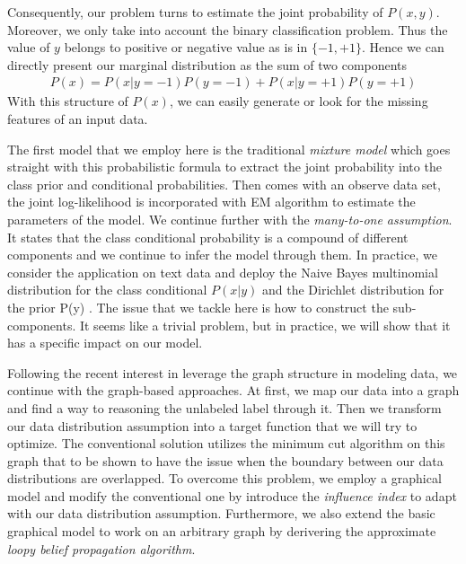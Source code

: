 Consequently, our problem turns to estimate the joint probability of $P(x, y)$. Moreover, we only take into account the binary classification problem. Thus the value of $y$ belongs to positive or negative value as is in $\{-1, +1\}$. Hence we can directly present our marginal distribution as the sum of two components
\begin{align}
	\label{equal1: mixture of labels}
	P(x) = P(x| y=-1)P(y=-1) + P(x| y=+1)P(y=+1)
\end{align} 
With this structure of $P(x)$, we can easily generate or look for the missing features of an input data.

The first model that we employ here is the traditional \textit{mixture model} which goes straight with this probabilistic formula to extract the joint probability into the class prior and conditional probabilities. Then comes with an observe data set, the joint log-likelihood is incorporated with EM algorithm \parencite{10.2307/2984875} to estimate the parameters of the model. We continue further with the \textit{many-to-one assumption}. It states that the class conditional probability is a compound of different components and we continue to infer the model through them. In practice, we consider the application on text data and deploy the Naive Bayes multinomial distribution for the class conditional $P(x|y)$ and the Dirichlet distribution for the prior P(y) \parencite{Nigam:2000:TCL:347709.347724}. The issue that we tackle here is how to construct the sub-components. It seems like a trivial problem, but in practice, we will show that it has a specific impact on our model.

Following the recent interest in leverage the graph structure in modeling data, we continue with the graph-based approaches. At first, we map our data into a graph and find a way to reasoning the unlabeled label through it. Then we transform our data distribution assumption into a target function that we will try to optimize. The conventional solution utilizes the minimum cut algorithm on this graph \parencite{Blum:2001:LLU:645530.757779} that to be shown to have the issue when the boundary between our data distributions are overlapped. To overcome this problem, we employ a graphical model and modify the conventional one by introduce the \textit{influence index} to adapt with our data distribution assumption. Furthermore, we also extend the basic graphical model to work on an arbitrary graph by derivering the approximate \textit{loopy belief propagation algorithm}.

